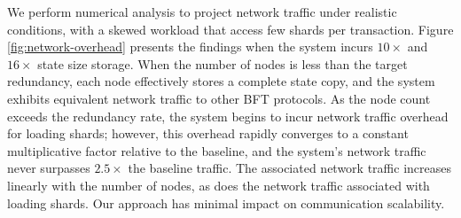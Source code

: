 We perform numerical analysis to project network traffic under realistic conditions, with a skewed workload that access few shards per transaction.
Figure \ref{fig:network-overhead} presents the findings when the system incurs $10\times$ and $16\times$ state size storage.
When the number of nodes is less than the target redundancy, each node effectively stores a complete state copy, and the system exhibits equivalent network traffic to other BFT protocols.
As the node count exceeds the redundancy rate, the system begins to incur network traffic overhead for loading shards; however, this overhead rapidly converges to a constant multiplicative factor relative to the baseline, and the system's network traffic never surpasses $2.5\times$ the baseline traffic.
The associated network traffic increases linearly with the number of nodes, as does the network traffic associated with loading shards.
Our approach has minimal impact on communication scalability.
